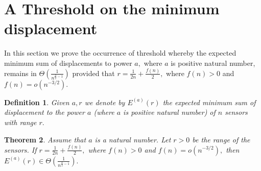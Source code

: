 \documentclass[final,5p,times,twocolumn]{elsarticle_mod}
\newtheorem{theorem}{Theorem}
\newtheorem{Definition}[theorem]{Definition}
\begin{document}
\section{A Threshold on the minimum displacement}
\label{Minimum displacement:sec}
In this section
we prove the occurrence of threshold
whereby the expected minimum sum of
displacements to power $a,$ where $a$ is positive natural number, remains in $\Theta\left(\frac{1}{n^{\frac{a}{2}-1}}\right)$
provided that $r=\frac{1}{2n}+\frac{f(n)}{2},$ where $f(n)>0$ and $f(n)=o(n^{-3/2}).$
\begin{Definition}
Given $a, r$ we denote by $E^{(a)}(r)$ the expected minimum sum of displacement to the power $a$ (where $a$ is positive natural number) of $n$ sensors
with range $r.$
\end{Definition}
\begin{theorem}
\label{cov1:thm}
Assume that $a$ is a natural number. Let $r>0$ be the range of the sensors.
If   $r=\frac{1}{2n}+\frac{f(n)}{2},$ where $f(n)>0$ and $f(n)=o(n^{-3/2}),$ then
$E^{(a)}(r) \in \Theta\left(\frac{1}{n^{\frac{a}{2}-1}}\right).$
\end{theorem}
\end{document}
